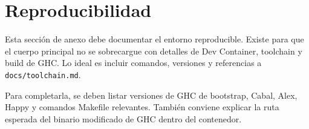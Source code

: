 
\section{Reproducibilidad}

Esta sección de anexo debe documentar el entorno reproducible. Existe para que el cuerpo principal no se sobrecargue con detalles de Dev Container, toolchain y build de GHC. Lo ideal es incluir comandos, versiones y referencias a \verb|docs/toolchain.md|.

Para completarla, se deben listar versiones de GHC de bootstrap, Cabal, Alex, Happy y comandos Makefile relevantes. También conviene explicar la ruta esperada del binario modificado de GHC dentro del contenedor.
